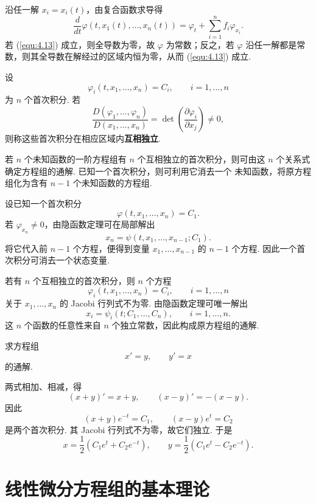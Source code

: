 \begin{pf1}
沿任一解 $x_i=x_i(t)$，由复合函数求导得
\[
\frac{d}{dt}\varphi(t,x_1(t),\ldots,x_n(t))
=\varphi_t+\sum_{i=1}^n f_i\varphi_{x_i}.
\]
若 (\ref{equ:4.13}) 成立，则全导数为零，故 $\varphi$ 为常数；反之，若
$\varphi$ 沿任一解都是常数，则其全导数在解经过的区域内恒为零，从而
(\ref{equ:4.13}) 成立.
\end{pf1}

\begin{deff}[(独立性)]
设
\[
\varphi_i(t,x_1,\ldots,x_n)=C_i,\qquad i=1,\ldots,n
\]
为 $n$ 个首次积分. 若
\[
\frac{D(\varphi_1,\ldots,\varphi_n)}
{D(x_1,\ldots,x_n)}
=\det\left(\frac{\partial\varphi_i}{\partial x_j}\right)\ne0,
\]
则称这些首次积分在相应区域内\textbf{互相独立}.
\end{deff}

\begin{thm}\label{thm:4.2.3}
若 $n$ 个未知函数的一阶方程组有 $n$ 个互相独立的首次积分，则可由这
$n$ 个关系式确定方程组的通解. 已知一个首次积分，则可利用它消去一个
未知函数，将原方程组化为含有 $n-1$ 个未知函数的方程组.
\end{thm}

\begin{pf1}
设已知一个首次积分
\[
\varphi(t,x_1,\ldots,x_n)=C_1.
\]
若 $\varphi_{x_n}\ne0$，由隐函数定理可在局部解出
\[
x_n=\psi(t,x_1,\ldots,x_{n-1};C_1).
\]
将它代入前 $n-1$ 个方程，便得到变量
$x_1,\ldots,x_{n-1}$ 的 $n-1$ 个方程. 因此一个首次积分可消去一个状态变量.

若有 $n$ 个互相独立的首次积分，则 $n$ 个方程
\[
\varphi_i(t,x_1,\ldots,x_n)=C_i,\qquad i=1,\ldots,n
\]
关于 $x_1,\ldots,x_n$ 的 Jacobi 行列式不为零. 由隐函数定理可唯一解出
\[
x_i=\psi_i(t;C_1,\ldots,C_n),\qquad i=1,\ldots,n.
\]
这 $n$ 个函数的任意性来自 $n$ 个独立常数，因此构成原方程组的通解.
\end{pf1}

\begin{eg}
求方程组
\[
x'=y,\qquad y'=x
\]
的通解.
\begin{pf2}
两式相加、相减，得
\[
(x+y)'=x+y,\qquad (x-y)'=-(x-y).
\]
因此
\[
(x+y)e^{-t}=C_1,\qquad (x-y)e^t=C_2
\]
是两个首次积分. 其 Jacobi 行列式不为零，故它们独立. 于是
\[
x=\frac12\left(C_1e^t+C_2e^{-t}\right),
\qquad
y=\frac12\left(C_1e^t-C_2e^{-t}\right).
\]
\end{pf2}
\end{eg}

\section{线性微分方程组的基本理论}\label{sec:4.3}

